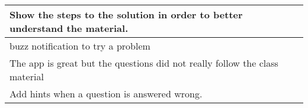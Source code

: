\begin{longtable}{|p{1\linewidth}|}
		\hline
		Show the steps to the solution in order to better understand the material.                                                                                                                                                                                                                                                                                                                                                                                                                                                                                                                                                                                                                       \\
		\hline
		buzz notification to try a problem                                                                                                                                                                                                                                                                                                                                                                                                                                                                                                                                                                                                                                                               \\
		\hline
		The app is great but the questions did not really follow the class material                                                                                                                                                                                                                                                                                                                                                                                                                                                                                                                                                                                                                      \\
		\hline
		Add hints when a question is answered wrong.                                                                                                                                                                                                                                                                                                                                                                                                                                                                                                                                                                                                                                                     \\

\end{longtable}

